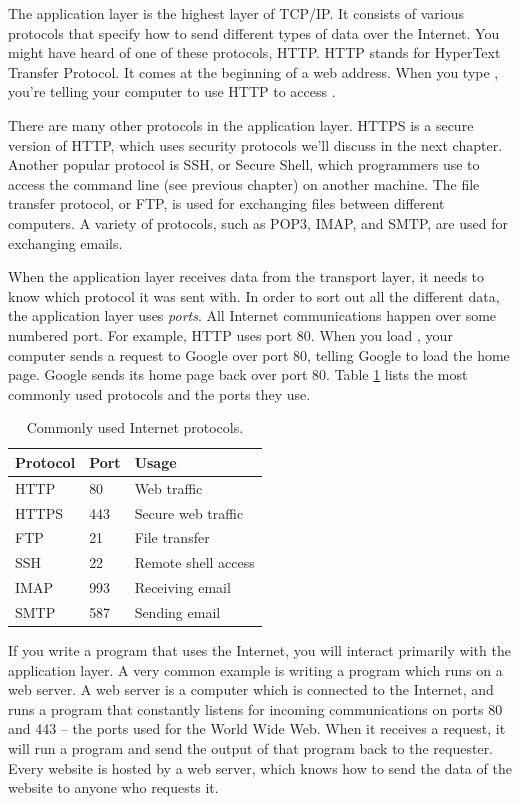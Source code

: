 The application layer is the highest layer of TCP/IP. It consists of various protocols that specify how to send different types of data over the Internet. You might have heard of one of these protocols, HTTP. HTTP stands for HyperText Transfer Protocol. It comes at the beginning of a web address. When you type , you're telling your computer to use HTTP to access .

There are many other protocols in the application layer. HTTPS is a secure version of HTTP, which uses security protocols we'll discuss in the next chapter. Another popular protocol is SSH, or Secure Shell, which programmers use to access the command line (see previous chapter) on another machine. The file transfer protocol, or FTP, is used for exchanging files between different computers. A variety of protocols, such as POP3, IMAP, and SMTP, are used for exchanging emails.

When the application layer receives data from the transport layer, it needs to know which protocol it was sent with. In order to sort out all the different data, the application layer uses \emph{ports}. All Internet communications happen over some numbered port. For example, HTTP uses port 80. When you load , your computer sends a request to Google over port 80, telling Google to load the home page. Google sends its home page back over port 80. Table \ref{tab:common_ports} lists the most commonly used protocols and the ports they use.

\begin{table}
    \centering
    \begin{tabular}{lll}
        Protocol & Port & Usage \\
        \hline
        HTTP & 80 & Web traffic \\
        HTTPS & 443 & Secure web traffic \\
        FTP & 21 & File transfer \\
        SSH & 22 & Remote shell access \\
        IMAP & 993 & Receiving email \\
        SMTP & 587 & Sending email
    \end{tabular}
    \caption{Commonly used Internet protocols.}
    \label{tab:common_ports}
\end{table}

If you write a program that uses the Internet, you will interact primarily with the application layer. A very common example is writing a program which runs on a web server. A web server is a computer which is connected to the Internet, and runs a program that constantly listens for incoming communications on ports 80 and 443 -- the ports used for the World Wide Web. When it receives a request, it will run a program and send the output of that program back to the requester. Every website is hosted by a web server, which knows how to send the data of the website to anyone who requests it.

